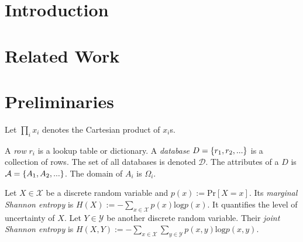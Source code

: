\documentclass[manuscript,screen,review,anonymous]{acmart}
\DeclarePairedDelimiter{\set}{\{}{\}}
\newcommand{\db}{D}
\newcommand{\dbs}{\mathcal{D}}
\newcommand{\prob}[1]{\text{Pr}[#1]}
\newcommand{\entropy}[1]{H(#1)}
\begin{document}



\maketitle

\section{Introduction}

\section{Related Work}

\clearpage

\section{Preliminaries}
\label{sec:prelim}

Let $\prod_i x_i$ denotes the Cartesian product of $x_i$s.

A \emph{row} $r_i$ is a lookup table or dictionary. A \emph{database} $\db = \set{r_1, r_2, ...}$ is a collection of rows. The set of all databases is denoted $\dbs$. The attributes of a $\db$ is $\mathcal{A} = \set{A_1, A_2, ...}$. The domain of $A_i$ is $\Omega_i$.

Let $X \in \mathcal{X}$ be a discrete random variable and $p(x) := \prob{X = x}$. Its \emph{marginal Shannon entropy} is $\entropy{X} := -\sum_{x \in \mathcal{X}} p(x) \text{log} p(x)$. It quantifies the level of uncertainty of $X$. Let $Y \in \mathcal{Y}$ be another discrete random variable. Their \emph{joint Shannon entropy} is $\entropy{X,Y} := -\sum_{x \in \mathcal{X}} \sum_{y \in \mathcal{Y}} p(x, y) \text{log} p(x, y)$.
\end{document}
